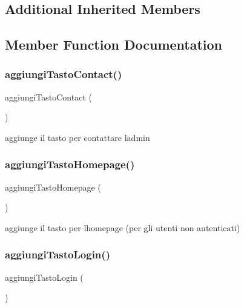 \subsection*{Additional Inherited Members}


\subsection{Member Function Documentation}
\mbox{\label{class_v_home_ac03aa54c6001e57b53284e6ddc21ffcf}} 
\subsubsection{\texorpdfstring{aggiungi\+Tasto\+Contact()}{aggiungiTastoContact()}}
{\footnotesize\ttfamily aggiungi\+Tasto\+Contact (\begin{DoxyParamCaption}{ }\end{DoxyParamCaption})}

aggiunge il tasto per contattare l\textquotesingle{}admin \mbox{\label{class_v_home_a72f16e9d9862a548b2669c6f1f28c7e7}} 
\subsubsection{\texorpdfstring{aggiungi\+Tasto\+Homepage()}{aggiungiTastoHomepage()}}
{\footnotesize\ttfamily aggiungi\+Tasto\+Homepage (\begin{DoxyParamCaption}{ }\end{DoxyParamCaption})}

aggiunge il tasto per l\textquotesingle{}homepage (per gli utenti non autenticati) \mbox{\label{class_v_home_a9f4f529088918cace57553a3db123152}} 
\subsubsection{\texorpdfstring{aggiungi\+Tasto\+Login()}{aggiungiTastoLogin()}}
{\footnotesize\ttfamily aggiungi\+Tasto\+Login (\begin{DoxyParamCaption}{ }\end{DoxyParamCaption})}

